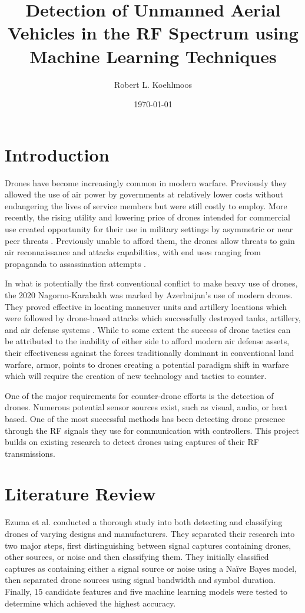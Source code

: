 \documentclass[12pt]{article}
\title{Detection of Unmanned Aerial Vehicles in the RF Spectrum using Machine Learning Techniques}
\author{Robert L. Koehlmoos} %
\date{\today}
\begin{document}
\maketitle
\section{Introduction}

Drones have become increasingly common in modern warfare. Previously they allowed the use of air power by governments at relatively lower costs without endangering the lives of service members but were still costly to employ. More recently, the rising utility and lowering price of drones intended for commercial use created opportunity for their use in military settings by asymmetric or near peer threats \cite{TalibanDrones}. Previously unable to afford them, the drones allow threats to gain air reconnaissance and attacks capabilities, with end uses ranging from propaganda to assassination attempts \cite{DroneImagery}.

In what is potentially the first conventional conflict to make heavy use of drones, the 2020 Nagorno-Karabakh was marked by Azerbaijan’s use of modern drones. They proved effective in locating maneuver units and artillery locations which were followed by drone-based attacks which successfully destroyed tanks, artillery, and air defense systems \cite{AzerbaijanDrones}. While to some extent the success of drone tactics can be attributed to the inability of either side to afford modern air defense assets, their effectiveness against the forces traditionally dominant in conventional land warfare, armor, points to drones creating a potential paradigm shift in warfare which will require the creation of new technology and tactics to counter.

One of the major requirements for counter-drone efforts is the detection of drones. Numerous potential sensor sources exist, such as visual, audio, or heat based. One of the most successful methods has been detecting drone presence through the RF signals they use for communication with controllers. This project builds on existing research to detect drones using captures of their RF transmissions.

\section{Literature Review}

Ezuma et al. \cite{DroneDetection} conducted a thorough study into both detecting and classifying drones of varying designs and manufacturers. They separated their research into two major steps, first distinguishing between signal captures containing drones, other sources, or noise and then classifying them. They initially classified captures as containing either a signal source or noise using a Naïve Bayes model, then separated drone sources using signal bandwidth and symbol duration. Finally, 15 candidate features and five machine learning models were tested to determine which achieved the highest accuracy.
\end{document}
